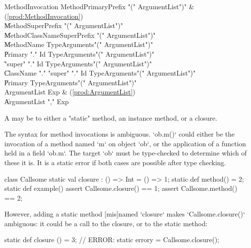 \begin{bbgrammar}
    MethodInvocation \: MethodPrimaryPrefix \xcd"(" ArgumentList\opt \xcd")" & (\ref{prod:MethodInvocation}) \\
                    \| MethodSuperPrefix \xcd"(" ArgumentList\opt \xcd")" \\
                    \| MethodClassNameSuperPrefix \xcd"(" ArgumentList\opt \xcd")" \\
                    \| MethodName TypeArguments\opt \xcd"(" ArgumentList\opt \xcd")" \\
                    \| Primary \xcd"." Id TypeArguments\opt \xcd"(" ArgumentList\opt \xcd")" \\
                    \| \xcd"super" \xcd"." Id TypeArguments\opt \xcd"(" ArgumentList\opt \xcd")" \\
                    \| ClassName \xcd"." \xcd"super"  \xcd"." Id TypeArguments\opt \xcd"(" ArgumentList\opt \xcd")" \\
                    \| Primary TypeArguments\opt \xcd"(" ArgumentList\opt \xcd")" \\
        ArgumentList \: Exp & (\ref{prod:ArgumentList}) \\
                    \| ArgumentList \xcd"," Exp \\
\end{bbgrammar}


A  may be to either a \xcd"static" method, an
instance method, or a closure.

The syntax for method invocations is ambiguous. \xcd`ob.m()` could either be
the invocation of a method named \xcd`m` on object \xcd`ob`, or the
application of a function held in a field \xcd`ob.m`. The target \xcd`ob` must
be type-checked to determine which of these it is.  It is a static error if
both cases are possible after type checking.

\begin{ex}
\begin{xten}
class Callsome {
  static val closure : () => Int = () => 1;
  static def method()            = 2;
  static def example() {
     assert Callsome.closure() == 1;
     assert Callsome.method()  == 2;
  } 
}
\end{xten}
However, adding a static method [mis]named \xcd`closure` makes
\xcd`Callsome.closure()` 
ambiguous: it could be a call to the closure, or to the static method: 
\begin{xten}
  static def closure () = 3;
  // ERROR: static errory = Callsome.closure();
\end{xten}
\end{ex}


